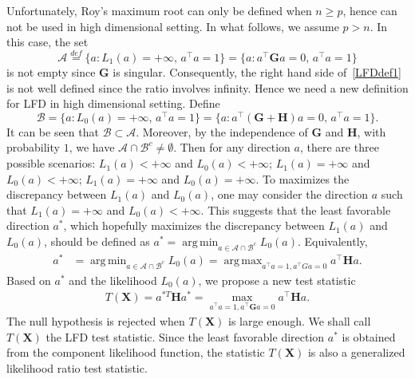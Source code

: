 \documentclass[12pt]{article} %
\DeclareMathOperator*{\argmax}{arg\,max}
\DeclareMathOperator*{\argmin}{arg\,min}
\newcommand{\bX}{\mathbf{X}}
\newcommand{\bH}{\mathbf{H}}
\newcommand{\bG}{\mathbf{G}}
\theoremstyle{definition}
\begin{document}
Unfortunately, Roy's maximum root can only be defined when $n\geq p$, hence can not be used in high dimensional setting.
In what follows, we assume $p>n$.
In this case,
the set
$$\mathcal{A}\overset{def}{=}\{a:L_1(a)=+\infty, \, a^\top a=1\}=\{a:a^\top \bG a=0, \, a^\top a=1\}$$
is not empty since $\bG$ is singular. 
Consequently, the right hand side of~\eqref{LFDdef1} is not well defined since the ratio involves infinity.
Hence we need a new definition for LFD in high dimensional setting.
Define
$$\mathcal{B}=\{a:L_0(a)=+\infty, \, a^\top a=1\}=\{a:a^\top (\bG+\bH)a= 0, \, a^\top a=1\}.$$
It can be seen that $\mathcal{B}\subset \mathcal{A}$.
Moreover, by the independence of $\bG$ and $\bH$, with probability $1$, we have $\mathcal{A}\cap \mathcal{B}^c\neq \emptyset$.
Then for any direction $a$, there are three possible scenarios: $L_1(a)<+\infty$ and $L_0(a)<+\infty$; $L_1(a)=+\infty$ and $L_0(a)<+\infty$; $L_1(a)=+\infty$ and $L_0(a)=+\infty$.
To maximizes the discrepancy between $L_1(a)$ and $L_0(a)$, one may consider the direction $a$ such that $L_1(a)=+\infty$ and $L_0(a)<+\infty$.
This suggests that the least favorable direction $a^*$, which hopefully maximizes the discrepancy between $L_1(a)$ and $L_0(a)$, should be defined as $a^* = \argmin_{a\in\mathcal{A}\cap\mathcal{B}^c} L_0 (a)$.
Equivalently,
$$
\begin{aligned}
    a^*&=\argmin_{a\in \mathcal{A}\cap\mathcal{B}^c} L_0(a) = \argmax_{a^\top a=1,a^\top Ga=0} {a^\top \bH a}.
\end{aligned}
$$
Based on $a^*$ and the likelihood $L_0(a)$, we propose a new test statistic
\begin{equation*}
    \begin{aligned}
        T(\bX)=a^{*T} \bH a^*
        =
        \max_{a^\top a=1, a^\top \bG a=0} 
        a^\top \bH a.
    \end{aligned}
\end{equation*}
The null hypothesis is rejected when $T(\bX)$ is large enough.
We shall call $T(\bX)$ the LFD test statistic.
Since the least favorable direction $a^*$ is obtained from the component likelihood function, the statistic $T(\bX)$ is also a generalized likelihood ratio test statistic.
\end{document}
